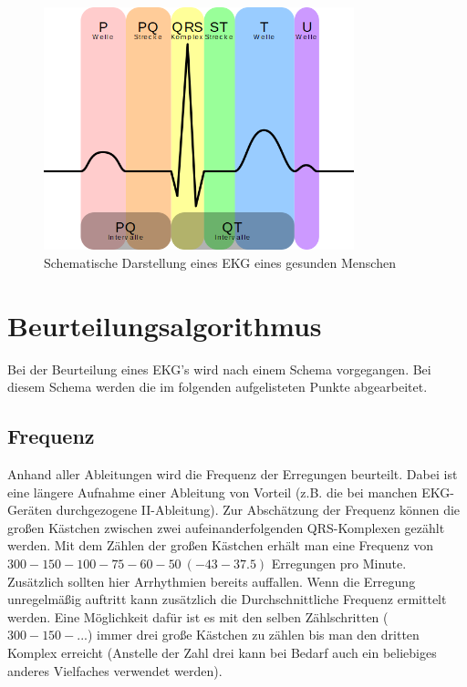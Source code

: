
\begin{figure}[H]
	\centering
	\includegraphics[width=9cm]{./img/EKG_Complex_de}
	\caption{Schematische Darstellung eines EKG eines gesunden Menschen \cite{ekg_symbolic}} \label{01:Wellen-Gesamterregung-Beschriftet}
\end{figure}

\section{Beurteilungsalgorithmus}
Bei der Beurteilung eines EKG's wird nach einem Schema vorgegangen. Bei diesem Schema werden die im folgenden aufgelisteten Punkte abgearbeitet.

\subsection{Frequenz}
Anhand aller Ableitungen wird die Frequenz der Erregungen beurteilt. Dabei ist eine längere Aufnahme einer Ableitung von Vorteil (z.B. die bei manchen EKG-Geräten durchgezogene II-Ableitung). Zur Abschätzung der Frequenz können die großen Kästchen zwischen zwei aufeinanderfolgenden QRS-Komplexen gezählt werden. Mit dem Zählen der großen Kästchen erhält man eine Frequenz von $300 - 150 - 100 - 75 - 60 - 50\ (- 43 - 37.5)$ Erregungen pro Minute.\\
Zusätzlich sollten hier Arrhythmien bereits auffallen. Wenn die Erregung unregelmäßig auftritt kann zusätzlich die Durchschnittliche Frequenz ermittelt werden. Eine Möglichkeit dafür ist es mit den selben Zählschritten ($300 - 150 - ...$) immer drei große Kästchen zu zählen bis man den dritten Komplex erreicht (Anstelle der Zahl drei kann bei Bedarf auch ein beliebiges anderes Vielfaches verwendet werden).

